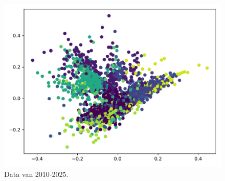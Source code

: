 \documentclass[a4paper,fontsize=11pt]{article}
\begin{document}
\begin{figure}[H]
  \centering
  \includegraphics[width=\textwidth]{pca_2010-2025.pdf}
  \caption{Data van 2010-2025.}
  \label{fig:2010}
\end{figure}


\appendix
\end{document}
